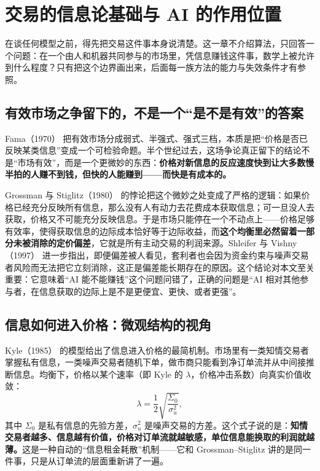 \section{交易的信息论基础与 AI 的作用位置}\label{sec:foundations}

在谈任何模型之前，得先把交易这件事本身说清楚。这一章不介绍算法，只回答一个问题：在一个由人和机器共同参与的市场里，凭信息赚钱这件事，数学上被允许到什么程度？只有把这个边界画出来，后面每一族方法的能力与失效条件才有参照。

\subsection{有效市场之争留下的，不是一个“是不是有效”的答案}

Fama（1970）\cite{fama1970} 把有效市场分成弱式、半强式、强式三档，本质是把“价格是否已反映某类信息”变成一个可检验命题。半个世纪过去，这场争论真正留下的结论不是“市场有效”，而是一个更微妙的东西：\textbf{价格对新信息的反应速度快到让大多数慢半拍的人赚不到钱，但快的人能赚到——而快是有成本的。}

Grossman 与 Stiglitz（1980）\cite{grossmanstiglitz1980} 的悖论把这个微妙之处变成了严格的逻辑：如果价格已经充分反映所有信息，那么没有人有动力去花费成本获取信息；可一旦没人去获取，价格又不可能充分反映信息。于是市场只能停在一个不动点上——价格足够有效率，使得获取信息的边际成本恰好等于边际收益，而\textbf{这个均衡里必然留着一部分未被消除的定价偏差}，它就是所有主动交易的利润来源。Shleifer 与 Vishny（1997）\cite{shleifer1997} 进一步指出，即便偏差被人看见，套利者也会因为资金约束与噪声交易者风险而无法把它立刻消除，这正是偏差能长期存在的原因。这个结论对本文至关重要：它意味着“AI 能不能赚钱”这个问题问错了，正确的问题是“AI 相对其他参与者，在信息获取的边际上是不是更便宜、更快、或者更强”。

\subsection{信息如何进入价格：微观结构的视角}

Kyle（1985）\cite{kyle1985} 的模型给出了信息进入价格的最简机制。市场里有一类知情交易者掌握私有信息，一类噪声交易者随机下单，做市商只能看到净订单流并从中间接推断信息。均衡下，价格以某个速率（即 Kyle 的 $\lambda$，价格冲击系数）向真实价值收敛：
\begin{equation}
  \lambda = \frac{1}{2}\sqrt{\frac{\Sigma_0}{\sigma_u^2}},
\end{equation}
其中 $\Sigma_0$ 是私有信息的先验方差，$\sigma_u^2$ 是噪声交易的方差。这个式子说的是：\textbf{知情交易者越多、信息越有价值，价格对订单流就越敏感，单位信息能换取的利润就越薄。}这是一种自动的“信息租金耗散”机制——它和 Grossman--Stiglitz 讲的是同一件事，只是从订单流的层面重新讲了一遍。

